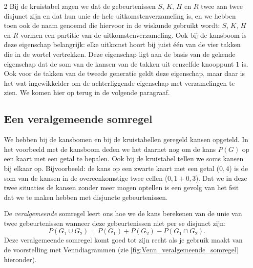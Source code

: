 \begin{multicols}{2}
Bij de kruistabel zagen we dat de gebeurtenissen $S$, $K$, $H$ en $R$ twee aan twee disjunct zijn en dat hun unie de hele uitkomstenverzameling is, en we hebben toen ook de naam genoemd die hiervoor in de wiskunde gebruikt wordt: $S$, $K$, $H$ en $R$ vormen een partitie van de uitkomstenverzameling. Ook bij de kansboom is deze eigenschap belangrijk: elke uitkomst hoort bij juist één van de vier takken die in de wortel vertrekken. Deze eigenschap ligt aan de basis van de gekende eigenschap dat de som van de kansen van de takken uit eenzelfde knooppunt $1$ is. Ook voor de takken van de tweede generatie geldt deze eigenschap, maar daar is het wat ingewikkelder om de achterliggende eigenschap met verzamelingen te zien. We komen hier op terug in de volgende paragraaf.

\subsection*{Een veralgemeende somregel}
We hebben bij de kansbomen en bij de kruistabellen geregeld kansen opgeteld. In het voorbeeld met de kansboom deden we het daarnet nog om de kans $P(G)$ op een kaart met een getal te bepalen. Ook bij de kruistabel tellen we soms kansen bij elkaar op. Bijvoorbeeld: de kans op een zwarte kaart met een getal ($0,4$) is de som van de kansen in de overeenkomstige twee cellen ($0,1+0,3$). Dat we in deze twee situaties de kansen zonder meer mogen optellen is een gevolg van het feit dat we te maken hebben met disjuncte gebeurtenissen.

De \emph{veralgemeende} somregel leert ons hoe we de kans berekenen van de unie van twee gebeurtenissen wanneer deze gebeurtenissen niet per se disjunct zijn: 
$$P(G_1 \cup G_2 )=P(G_1 )+P(G_2 )-P(G_1 \cap G_2).$$ 
Deze veralgemeende somregel komt goed tot zijn recht als je gebruik maakt van de voorstelling met Venndiagrammen (zie \autoref{fig:Venn_veralgemeende_somregel} hieronder).

\begin{afbeeldingenv}
\caption{Venndiagram bij de veralgemeende somregel}
\label{fig:Venn_veralgemeende_somregel}
\end{afbeeldingenv}


\end{multicols}
